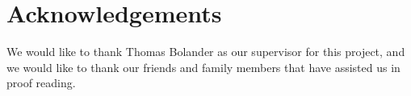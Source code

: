 \chapter{Acknowledgements}

We would like to thank Thomas Bolander as our supervisor for this project, and we would like to thank our friends and family members that have assisted us in proof reading.

